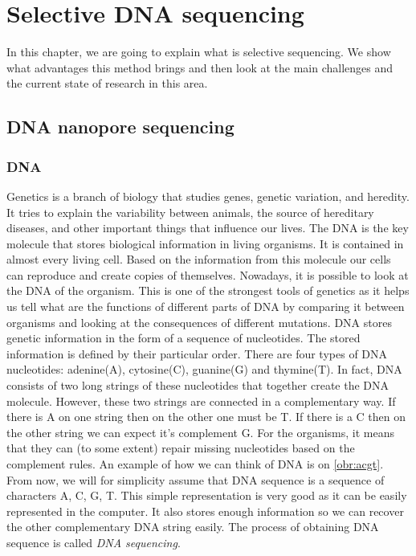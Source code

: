 \chapter{Selective DNA sequencing}

\label{kap:selSeq} %

In this chapter, we are going to explain what is selective sequencing. We
show what advantages this method brings and then look at the main challenges and
the current state of research in this area.

\section{DNA nanopore sequencing}

\subsection{DNA}

Genetics is a branch of biology that studies genes, genetic variation, and heredity.
It tries to explain the variability between animals, the source of hereditary diseases, and
other important things that influence our lives. The DNA is the key molecule
that stores biological information in living organisms. It is contained in
almost every living cell. Based on the information from this molecule our cells can reproduce and create copies of
themselves. Nowadays, it is possible to look at the DNA of the organism. This is
one of the strongest tools of genetics as it helps us tell what are the functions
of different parts of DNA by comparing it between organisms and looking at the
consequences of different mutations. DNA stores genetic information in the form of a sequence of
nucleotides. The stored information is defined by their particular order. There are four types of DNA nucleotides:
adenine(A), cytosine(C), guanine(G) and thymine(T). In fact, DNA consists of two long
strings of these nucleotides that together create the DNA molecule. However, these
two strings are connected in a complementary way. If there is A on one string
then on the other one must be T. If there is a C then on the other string we can expect
it's complement G. For the organisms, it means that they can (to some extent) repair
missing nucleotides based on the complement rules. An example of how we can think
of DNA is on \ref{obr:acgt}. From now, we will for simplicity assume that DNA
sequence is a sequence of characters A, C, G, T. This simple representation
is very good as it can be easily represented in the computer. It also stores enough
information so we can recover the other complementary DNA string easily.
The process of obtaining DNA sequence is called \textit{DNA sequencing}.


